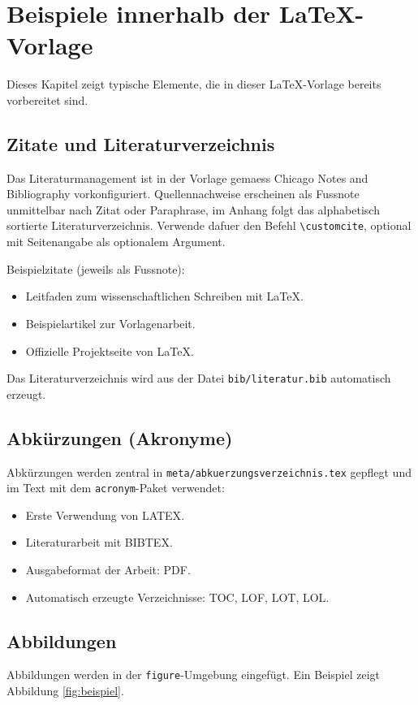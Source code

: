 \chapter{Beispiele innerhalb der LaTeX-Vorlage}

Dieses Kapitel zeigt typische Elemente, die in dieser LaTeX-Vorlage bereits vorbereitet sind.

\section{Zitate und Literaturverzeichnis}
Das Literaturmanagement ist in der Vorlage gemaess Chicago Notes and Bibliography vorkonfiguriert. Quellennachweise erscheinen als Fussnote unmittelbar nach Zitat oder Paraphrase, im Anhang folgt das alphabetisch sortierte Literaturverzeichnis. Verwende dafuer den Befehl \verb|\customcite|, optional mit Seitenangabe als optionalem Argument.

Beispielzitate (jeweils als Fussnote):
\begin{itemize}
    \item Leitfaden zum wissenschaftlichen Schreiben mit LaTeX.
    \item Beispielartikel zur Vorlagenarbeit.
    \item Offizielle Projektseite von LaTeX.
\end{itemize}
Das Literaturverzeichnis wird aus der Datei \texttt{bib/literatur.bib} automatisch erzeugt.

\section{Abkürzungen (Akronyme)}
Abkürzungen werden zentral in \texttt{meta/abkuerzungsverzeichnis.tex} gepflegt und im Text mit dem \texttt{acronym}-Paket verwendet:
\begin{itemize}
    \item Erste Verwendung von \ac{LATEX}.
    \item Literaturarbeit mit \ac{BIBTEX}.
    \item Ausgabeformat der Arbeit: \ac{PDF}.
    \item Automatisch erzeugte Verzeichnisse: \ac{TOC}, \ac{LOF}, \ac{LOT}, \ac{LOL}.
\end{itemize}

\section{Abbildungen}
Abbildungen werden in der \texttt{figure}-Umgebung eingefügt. Ein Beispiel zeigt Abbildung \ref{fig:beispiel}.


